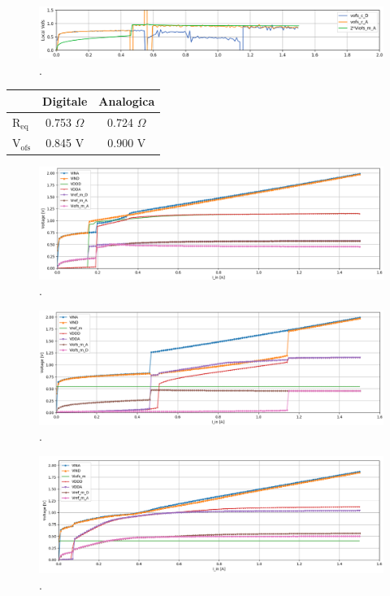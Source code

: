 \begin{figure}
\centering
\includegraphics[scale=.27]{Immagini/IUISubPlotVofs}
\caption{.}
\label{IUISubPlotVofs}
\end{figure}

\begin{center}
\begin{tabular}{|l|c|c|}
\hline
&Digitale  &Analogica \\ \hline
$\mathrm{R_{eq}}$ & 0.753 $\Omega$& 0.724 $\Omega$ \\ \hline
$\mathrm{V_{ofs}}$ & 0.845 V & 0.900 V\\ \hline
\end{tabular}
\end{center}

\begin{figure}
\centering
\includegraphics[scale=.3]{Immagini/IDI2}
\caption{.}
\label{IDI}
\end{figure}

\begin{figure}
\centering
\includegraphics[scale=.3]{Immagini/IUEVref2}
\caption{.}
\label{IDEVref}
\end{figure}

\begin{figure}
\centering
\includegraphics[scale=.3]{Immagini/IUEViofs2}
\caption{.}
\label{IDEViofs}
\end{figure}


